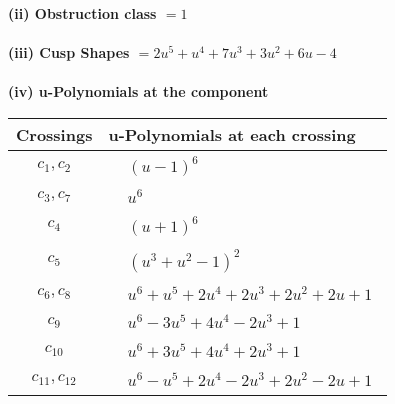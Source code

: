 \documentclass[1p]{elsarticle_modified}
\theoremstyle{definition}
\begin{document}
\flushleft \textbf{(ii) Obstruction class $= 1$}\\~\\
\flushleft \textbf{(iii) Cusp Shapes $= 2 u^5+u^4+7 u^3+3 u^2+6 u-4$}\\~\\
\newpage\renewcommand{\arraystretch}{1}
\flushleft \textbf{(iv) u-Polynomials at the component}\newline \\
\begin{tabular}{m{50pt}|m{274pt}}
Crossings & \hspace{64pt}u-Polynomials at each crossing \\
\hline $$\begin{aligned}c_{1},c_{2}\end{aligned}$$&$\begin{aligned}
&(u-1)^6
\end{aligned}$\\
\hline $$\begin{aligned}c_{3},c_{7}\end{aligned}$$&$\begin{aligned}
&u^6
\end{aligned}$\\
\hline $$\begin{aligned}c_{4}\end{aligned}$$&$\begin{aligned}
&(u+1)^6
\end{aligned}$\\
\hline $$\begin{aligned}c_{5}\end{aligned}$$&$\begin{aligned}
&(u^3+u^2-1)^2
\end{aligned}$\\
\hline $$\begin{aligned}c_{6},c_{8}\end{aligned}$$&$\begin{aligned}
&u^6+u^5+2 u^4+2 u^3+2 u^2+2 u+1
\end{aligned}$\\
\hline $$\begin{aligned}c_{9}\end{aligned}$$&$\begin{aligned}
&u^6-3 u^5+4 u^4-2 u^3+1
\end{aligned}$\\
\hline $$\begin{aligned}c_{10}\end{aligned}$$&$\begin{aligned}
&u^6+3 u^5+4 u^4+2 u^3+1
\end{aligned}$\\
\hline $$\begin{aligned}c_{11},c_{12}\end{aligned}$$&$\begin{aligned}
&u^6- u^5+2 u^4-2 u^3+2 u^2-2 u+1
\end{aligned}$\\
\hline
\end{tabular}\\~\\
\end{document}
